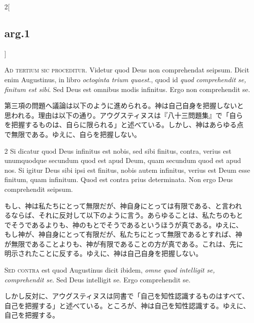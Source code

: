 \documentclass[paper=a4paper,fontsize=10pt,jafontsize=9pt,titlepage]{jlreq}
\begin{document}
\begin{paracol}{2}[\subsection{arg.1}]

{\huge A}{\scshape d tertium sic proceditur}. Videtur quod Deus non
comprehendat seipsum. Dicit enim Augustinus, in libro {\itshape
octoginta trium quaest}., quod id {\itshape quod comprehendit se,
finitum est sibi}. Sed Deus est omnibus modis infinitus. Ergo non
comprehendit se.

\switchcolumn

第三項の問題へ議論は以下のように進められる。神は自己自身を把握しないと
思われる。理由は以下の通り。アウグスティヌスは『八十三問題集』で「自ら
を把握するものは、自らに限られる」と述べている。しかし、神はあらゆる点
で無限である。ゆえに、自らを把握しない。

\switchcolumn*

2 Si dicatur quod Deus infinitus est nobis, sed sibi finitus, contra,
verius est unumquodque secundum quod est apud Deum, quam secundum quod
est apud nos. Si igitur Deus sibi ipsi est finitus, nobis autem
infinitus, verius est Deum esse finitum, quam infinitum. Quod est
contra prius determinata. Non ergo Deus comprehendit seipsum.

\switchcolumn

もし、神は私たちにとって無限だが、神自身にとっては有限である、と言われ
るならば、それに反対して以下のように言う。あらゆることは、私たちのもと
でそうであるよりも、神のもとでそうであるというほうが真である。ゆえに、
もし神が、神自身にとって有限だが、私たちにとって無限であるとすれば、神
が無限であることよりも、神が有限であることの方が真である。これは、先に
明示されたことに反する。ゆえに、神は自己自身を把握しない。

\switchcolumn*[\subsection{s.c.}]

{\scshape Sed contra} est quod Augustinus dicit ibidem, {\itshape omne
quod intelligit se, comprehendit se}. Sed Deus intelligit se. Ergo
comprehendit se.

\switchcolumn

しかし反対に、アウグスティヌスは同書で「自己を知性認識するものはすべて、
自己を把握する」と述べている。ところが、神は自己を知性認識する。ゆえに、
自己を把握する。



\end{paracol}
\end{document}
